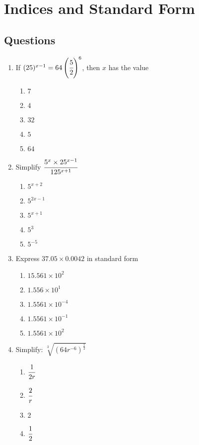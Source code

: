 \section{Indices and Standard Form}
\subsection{Questions}
\begin{multicols}{2}
\begin{enumerate}[label={\arabic*.}] 
\item If $(25)^{x-1} = 64\left(\cfrac{5}{2}\right)^6$, then $x$ has the value
	\begin{enumerate}[label={\Alph*.}]
	\item \(7\)
	\item \(4\)
	\item \(32\)
	\item \(5\)
	\item \(64\)
	\end{enumerate}
\item Simplify \(\cfrac{5^x \times 25^{x -1}}{125^{x+1}}\)
	\begin{enumerate}[label={\Alph*.}]
	\item \(5^{x+2}\)
	\item \(5^{2x -1}\)
	\item \(5^{x+1}\)
	\item \(5^3\)
	\item \(5^{-5}\)
	\end{enumerate}
\item Express $37.05 \times 0.0042$ in standard form 
	\begin{enumerate}[label={\Alph*.}]
	\item \(15.561 \times 10^2\)
	\item \(1.556 \times 10^1\)
	\item \(1.5561 \times 10^{-4}\)
	\item \(1.5561 \times 10^{-1}\)
	\item \(1.5561 \times 10^2\)
	\end{enumerate}
\item Simplify: $\sqrt[3]{(64r^{-6})^\frac{1}{2}}$
	\begin{enumerate}[label={\Alph*.}]
	\item \(\cfrac{1}{2r}\)
	\item \(\cfrac{2}{r}\)
	\item \(2\)
	\item \(\cfrac{1}{2}\)
	\end{enumerate}

\end{enumerate}
\end{multicols}
